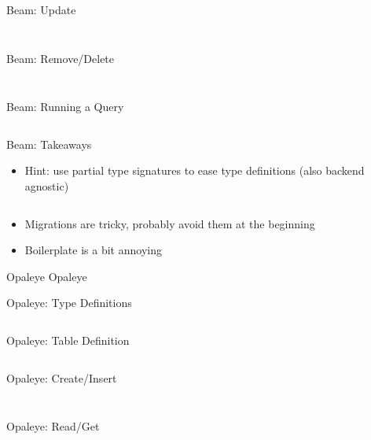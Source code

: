 \documentclass[hyperref={pdfpagelabels=false},12pt]{beamer}
\newcommand{\pygment}[3]{
  \inputminted[frame=single,framesep=2mm,linenos,fontsize=#1]{#2}{#3}
}
\newcommand{\pygmentLines}[5]{
  \inputminted[frame=single,framesep=2mm,linenos,fontsize=#1,firstline=#2,lastline=#3,autogobble]{#4}{#5}
}
\begin{document}
\begin{frame}{Beam: Update}
  \pygmentLines{\scriptsize}{154}{163}{haskell}{code/beam/src/Person.hs}
  \pygment{\scriptsize}{sql}{code/sql/updateSetWhereEmail.sql}
\end{frame}

\begin{frame}{Beam: Remove/Delete}
  \pygmentLines{\scriptsize}{165}{172}{haskell}{code/beam/src/Person.hs}
  \pygment{\scriptsize}{sql}{code/sql/deleteWhere.sql}
\end{frame}

\begin{frame}{Beam: Running a Query}
  \pygmentLines{\scriptsize}{37}{42}{haskell}{code/beam/test/Spec.hs}
\end{frame}

\begin{frame}{Beam: Takeaways}
  \begin{itemize}
    \item Hint: use partial type signatures to ease type definitions (also
      backend agnostic)
      \pygment{\scriptsize}{haskell}{code/partialTypeSigs.hs}
    \item Migrations are tricky, probably avoid them at the beginning
    \item Boilerplate is a bit annoying
  \end{itemize}
\end{frame}

\begin{frame}{Opaleye}
  \centering \Huge Opaleye
\end{frame}

\begin{frame}{Opaleye: Type Definitions}
  \pygmentLines{\scriptsize}{42}{62}{haskell}{code/opaleye-example/src/Person.hs}
\end{frame}

\begin{frame}{Opaleye: Table Definition}
  \pygmentLines{\scriptsize}{66}{86}{haskell}{code/opaleye-example/src/Person.hs}
\end{frame}

\begin{frame}{Opaleye: Create/Insert}
  \pygmentLines{\scriptsize}{98}{111}{haskell}{code/opaleye-example/src/Person.hs}
  \pygment{\scriptsize}{sql}{code/sql/insertInto.sql}
\end{frame}

\begin{frame}{Opaleye: Read/Get}
  \pygmentLines{\scriptsize}{127}{133}{haskell}{code/opaleye-example/src/Person.hs}
  \pygment{\scriptsize}{sql}{code/sql/selectWhere.sql}
\end{frame}
\end{document}

